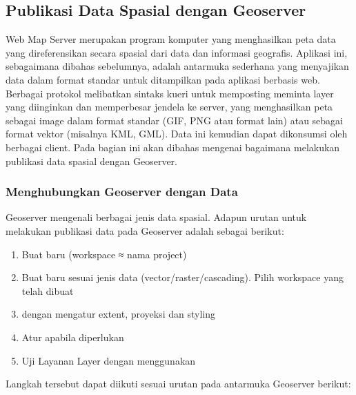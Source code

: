\documentclass[letterpaper,10pt,english]{sphinxmanual}
\begin{document}
\subsection{Publikasi Data Spasial dengan Geoserver}
\label{\detokenize{sesi3/publikasi:publikasi-data-spasial-dengan-geoserver}}\label{\detokenize{sesi3/publikasi::doc}}
Web Map Server merupakan program komputer yang menghasilkan peta data yang direferensikan secara spasial dari
data dan informasi geografis. Aplikasi ini, sebagaimana dibahas sebelumnya, adalah antarmuka sederhana yang menyajikan data dalam format standar untuk ditampilkan pada aplikasi berbasis web. Berbagai protokol melibatkan sintaks kueri untuk memposting meminta layer yang diinginkan dan memperbesar jendela ke server, yang menghasilkan peta sebagai image dalam format standar (GIF, PNG atau format lain) atau sebagai format vektor (misalnya KML, GML). Data ini kemudian dapat dikonsumsi oleh berbagai client. Pada bagian ini akan dibahas mengenai bagaimana melakukan publikasi data spasial dengan Geoserver.


\subsubsection{Menghubungkan Geoserver dengan Data}
\label{\detokenize{sesi3/publikasi:menghubungkan-geoserver-dengan-data}}
Geoserver mengenali berbagai jenis data spasial. Adapun urutan untuk melakukan publikasi data pada Geoserver adalah sebagai berikut:
\begin{enumerate}
%
\item {} 
Buat  baru (workspace ≈ nama project)

\item {} 
Buat  baru sesuai jenis data (vector/raster/cascading). Pilih workspace yang telah dibuat

\item {} 
 dengan mengatur extent, proyeksi dan styling

\item {} 
Atur  apabila diperlukan

\item {} 
Uji Layanan Layer dengan menggunakan 

\end{enumerate}

Langkah tersebut dapat diikuti sesuai urutan pada antarmuka Geoserver berikut:
\end{document}
